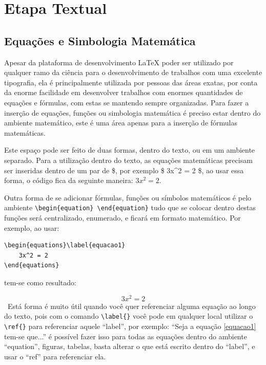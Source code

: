 \chapter{Etapa Textual}

\section{Equações e Simbologia Matemática}
Apesar da plataforma de desenvolvimento LaTeX poder ser utilizado por qualquer ramo da ciência para o desenvolvimento de trabalhos com uma excelente tipografia, ela é principalmente utilizada por pessoas das áreas exatas, por conta da enorme facilidade em desenvolver trabalhos com enormes quantidades de equações e fórmulas, com estas se mantendo sempre organizadas. Para fazer a inserção de equações, funções ou simbologia matemática é preciso estar dentro do ambiente matemático, este é uma área apenas para a inserção de fórmulas matemáticas. 

Este espaço pode ser feito de duas formas, dentro do texto, ou em um ambiente separado. Para a utilização dentro do texto, as equações matemáticas precisam ser inseridas dentro de um par de \$, por exemplo \$ 3x\textasciicircum 2 = 2 \$, ao usar essa forma, o código fica da seguinte maneira: $3x^2=2$.

Outra forma de se adicionar fórmulas, funções ou símbolos matemáticos é pelo ambiente \lstinline|\begin{equation} \end{equation}| tudo que se colocar dentro destas funções será centralizado, enumerado, e ficará em formato matemático. Por exemplo, ao usar:
\begin{lstlisting}
\begin{equations}\label{equacao1}
	3x^2 = 2
\end{equations}
\end{lstlisting}
tem-se como resultado:

\begin{equation}\label{equacao1}
	3x^2 = 2
\end{equation}
\
Está forma é muito útil quando você quer referenciar alguma equação ao longo do texto, pois com o comando \lstinline|\label{}| você pode em qualquer local utilizar o \lstinline|\ref{}| para referenciar aquele ``label'', por exemplo: ``Seja a equação \ref{equacao1} tem-se que...'' é possível fazer isso para todas as equações dentro do ambiente ``equation'', figuras, tabelas, basta alterar o que está escrito dentro do ``label'', e usar o ``ref'' para referenciar ela.

